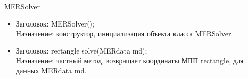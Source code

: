 \documentclass[a4paper,12pt]{article}
\begin{document}
{{\begin{center}
MERSolver
\end{center}
\begin{itemize}
\item Заголовок: MERSolver(); \\
Назначение: конструктор, инициализация объекта класса MERSolver.
\item Заголовок: rectangle solve(MERdata md);\\
Назначение: частный метод, возвращает координаты МПП rectangle, для данных MERdata md.
\newpage
\begin{figure}[h!]

\end{figure}
\end{itemize}}}
\end{document}

